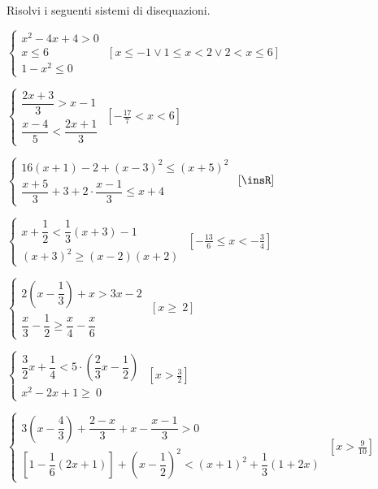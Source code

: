 \begin{esercizio}[\Ast]
 \label{ese:21.41}
 Risolvi i seguenti sistemi di disequazioni.
 \begin{enumeratea}
\item $\left\{\begin{array}{l}x^2-4x+4>0\\x\le 6\\1-x^2\le 0\end{array}\right.$
 \hfill $\left[x\le -1\vee 1\le x<2\vee 2<x\le 6\right]$
\item {\longarray $\left\{\begin{array}{l}
\dfrac{2x+3}{3}>x-1\\
\dfrac{x-4}{5}<\dfrac{2x+1}{3}
\end{array}\right.$}
 \hfill $\left[-{\frac{17}{7}}<x<6\right]$
\item {\longarray $\left\{\begin{array}{l}
16(x+1)-2+(x-3)^{2}\le(x+5)^{2}\\
\dfrac{x+5}{3}+3+2\cdot\dfrac{x-1}{3}\le x+4
\end{array}\right.$}
 \hfill $\left[\insR\right]$
\item $\left\{\begin{array}{l}
x+\dfrac{1}{2}<\dfrac{1}{3}(x+3)-1\\
(x+3)^{2}\ge (x-2)(x+2)
\end{array}\right.$
 \hfill $\left[-{\frac{13}{6}}\le x<-{\frac{3}{4}}\right]$
\item {\longarray $\left\{\begin{array}{l}
2\left(x-\dfrac{1}{3}\right)+x>3x-2\\
\dfrac{x}{3}-\dfrac{1}{2}\ge \dfrac{x}{4}-\dfrac{x}{6}
  \end{array}\right.$}
 \hfill $\left[x\ge~2\right]$
\item $\left\{\begin{array}{l}
  \dfrac{3}{2}x+\dfrac{1}{4}<5\cdot\left(\dfrac{2}{3}x-\dfrac{1}{2}\right)\\
  x^2-2x+1\ge~0
\end{array}\right.$
 \hfill $\left[x>\frac{3}{2}\right]$
\item {\longarray $\left\{\begin{array}{l}
3\left(x-\dfrac{4}{3}\right)+\dfrac{2-x}{3}+x-\dfrac{x-1}{3}>0\\
\left[1-\dfrac{1}{6}(2x+1)\right]+\left(x-\dfrac{1}{2}\right)^{2}<(x+1)^{2}+\dfrac{1}{3}(1+2x)
   \end{array}\right.$}
 \hfill $\left[x>\frac{9}{10}\right]$

\end{enumeratea}
\end{esercizio}
